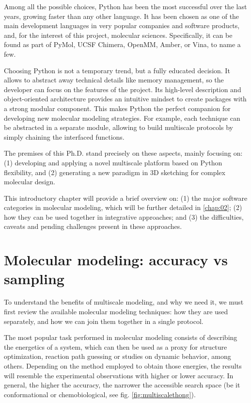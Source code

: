Among all the possible choices, Python has been the most successful over the last years, growing faster than any other language.\cite{stackoverflowpythongrowth} It has been chosen as one of the main development languages in very popular companies and software products,\cite{pythonsuccess,googlepython,facebookpython,netflixpython} and, for the interest of this project, molecular sciences. Specifically, it can be found as part of PyMol,\cite{delano2002pymol} UCSF Chimera,\cite{chimera} OpenMM,\cite{openmm} Amber,\cite{amber} or Vina,\cite{trott2010autodock} to name a few.

Choosing Python is not a temporary trend, but a fully educated decision. It allows to abstract away technical details like memory management, so the developer can focus on the features of the project. Its high-level description and object-oriented architecture provides an intuitive mindset to create packages with a strong modular component. This makes Python the perfect companion for developing new molecular modeling strategies. For example, each technique can be abstracted in a separate module, allowing to build multiscale protocols by simply chaining the interfaced functions.

The premises of this Ph.D. stand precisely on these aspects, mainly focusing on: (1) developing and applying a novel multiscale platform based on Python flexibility, and (2) generating a new paradigm in 3D sketching for complex molecular design.

This introductory chapter will provide a brief overview on: (1) the major software categories in molecular modeling, which will be further detailed in \autoref{chap:02}; (2) how they can be used together in integrative approaches; and (3) the difficulties, caveats and pending challenges present in these approaches.

\section{Molecular modeling: accuracy vs sampling}

To understand the benefits of multiscale modeling, and why we need it, we must first review the available molecular modeling techniques: how they are used separately, and how we can join them together in a single protocol.

The most popular task performed in molecular modeling consists of describing the energetics of a system, which can then be used as a proxy for structure optimization, reaction path guessing or studies on dynamic behavior, among others. Depending on the method employed to obtain those energies, the results will resemble the experimental observations with higher or lower accuracy. In general, the higher the accuracy, the narrower the accessible search space (be it conformational or chemobiological, see fig. \ref{fig:multiscalethong}).

